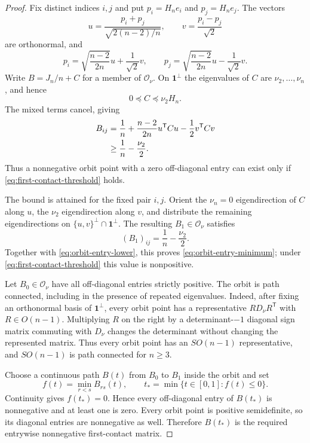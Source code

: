 \documentclass[11pt,reqno]{amsart}
\theoremstyle{definition}
\theoremstyle{remark}
\newcommand{\one}{\mathbf 1}
\begin{document}
\begin{proof}
Fix distinct indices $i,j$ and put $p_i=H_ne_i$ and $p_j=H_ne_j$.  The
vectors
\[
  u=\frac{p_i+p_j}{\sqrt{2(n-2)/n}},
  \qquad
  v=\frac{p_i-p_j}{\sqrt2}
\]
are orthonormal, and
\[
  p_i=\sqrt{\frac{n-2}{2n}}u+\frac1{\sqrt2}v,
  \qquad
  p_j=\sqrt{\frac{n-2}{2n}}u-\frac1{\sqrt2}v.
\]
Write $B=J_n/n+C$ for a member of $\mathcal O_\nu$.  On $\one^\perp$ the
eigenvalues of $C$ are $\nu_2,\ldots,\nu_n$, and hence
\[
  0\preceq C\preceq\nu_2H_n.
\]
The mixed terms cancel, giving
\begin{align}
  B_{ij}
  &=\frac1n+\frac{n-2}{2n}u^{\mathsf T}Cu
    -\frac12v^{\mathsf T}Cv \notag\\
  &\ge\frac1n-\frac{\nu_2}{2}.
  \label{eq:orbit-entry-lower}
\end{align}
Thus a nonnegative orbit point with a zero off-diagonal entry can exist only
if \eqref{eq:first-contact-threshold} holds.

The bound is attained for the fixed pair $i,j$.  Orient the $\nu_n=0$
eigendirection of $C$ along
$u$, the $\nu_2$ eigendirection along $v$, and distribute the remaining
eigendirections on $\{u,v\}^\perp\cap\one^\perp$.  The resulting
$B_1\in\mathcal O_\nu$ satisfies
\[
  (B_1)_{ij}=\frac1n-\frac{\nu_2}{2}.
\]
Together with \eqref{eq:orbit-entry-lower}, this proves
\eqref{eq:orbit-entry-minimum}; under
\eqref{eq:first-contact-threshold} this value is nonpositive.

Let $B_0\in\mathcal O_\nu$ have all off-diagonal entries strictly positive.
The orbit is path connected, including in the presence of repeated
eigenvalues.  Indeed, after fixing an orthonormal basis of $\one^\perp$,
every orbit point has a representative $RD_\nu R^{\mathsf T}$ with
$R\in O(n-1)$.  Multiplying $R$ on the right by a determinant-$-1$
diagonal sign matrix commuting with $D_\nu$ changes the determinant without
changing the represented matrix.  Thus every orbit point has an
$SO(n-1)$ representative, and $SO(n-1)$ is path connected for $n\ge3$.

Choose a continuous path $B(t)$ from $B_0$ to $B_1$ inside the orbit and set
\[
  f(t)=\min_{r<s}B_{rs}(t),
  \qquad
  t_* =\min\{t\in[0,1]:f(t)\le0\}.
\]
Continuity gives $f(t_*)=0$.  Hence every off-diagonal entry of $B(t_*)$ is
nonnegative and at least one is zero.  Every orbit point is positive
semidefinite, so its diagonal entries are nonnegative as well.  Therefore
$B(t_*)$ is the required entrywise nonnegative first-contact matrix.
\end{proof}
\end{document}
